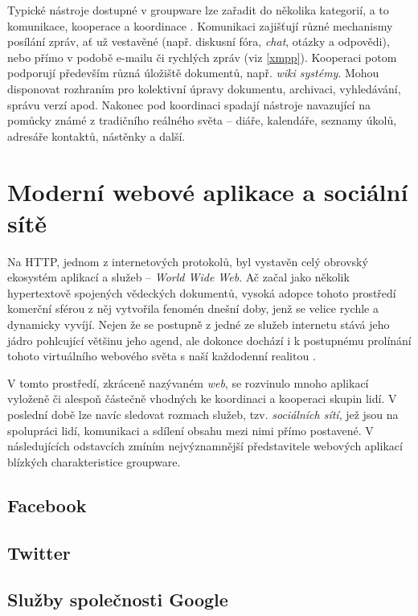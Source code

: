 \documentclass[12pt,oneside,final]{fithesis2}
\begin{document}
Typické nástroje dostupné v groupware lze zařadit do několika kategorií, a to komunikace, kooperace a koordinace \cite{kunstova1999skupinova}. Komunikaci zajišťují různé mechanismy posílání zpráv, ať už vestavěné (např. diskusní fóra, {\it chat}, otázky a odpovědi), nebo přímo v podobě e-mailu či rychlých zpráv (viz \ref{xmpp}). Kooperaci potom podporují především různá úložiště dokumentů, např. {\it wiki systémy}. Mohou disponovat rozhraním pro kolektivní úpravy dokumentu, archivaci, vyhledávání, správu verzí apod. Nakonec pod koordinaci spadají nástroje navazující na pomůcky známé z tradičního reálného světa -- diáře, kalendáře, seznamy úkolů, adresáře kontaktů, nástěnky a další.

\section{Moderní webové aplikace a sociální sítě}\label{web}
Na HTTP, jednom z internetových protokolů, byl vystavěn celý obrovský ekosystém aplikací a služeb -- {\it World Wide Web}. Ač začal jako několik hypertextově spojených vědeckých dokumentů, vysoká adopce tohoto prostředí komerční sférou z něj vytvořila fenomén dnešní doby, jenž se velice rychle a dynamicky vyvíjí. Nejen že se postupně z jedné ze služeb internetu stává jeho jádro pohlcující většinu jeho agend, ale dokonce dochází i k postupnému prolínání tohoto virtuálního webového světa s naší každodenní realitou \cite{thurlow2004computer}.

V tomto prostředí, zkráceně nazývaném {\it web}, se rozvinulo mnoho aplikací vyloženě či alespoň částečně vhodných ke koordinaci a kooperaci skupin lidí. V poslední době lze navíc sledovat rozmach služeb, tzv. {\it sociálních sítí}, jež jsou na spolupráci lidí, komunikaci a sdílení obsahu mezi nimi přímo postavené. V následujících odstavcích zmíním nejvýznamnější představitele webových aplikací blízkých charakteristice groupware.

\subsection{Facebook}\label{facebook}

\subsection{Twitter}\label{twitter}

\subsection{Služby společnosti Google}\label{google}
\end{document}
